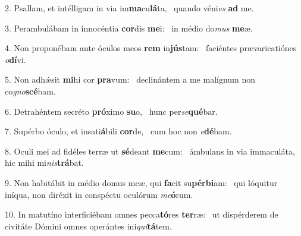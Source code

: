 2. Psallam, et intélligam in via im\textbf{ma}cu\textbf{lá}ta, \ast\  quando véni\textit{es} \textbf{ad} me.\

3. Perambulábam in innocéntia \textbf{cor}dis \textbf{me}i: \ast\  in médio do\textit{mus} \textbf{me}æ.\

4. Non proponébam ante óculos meos \textbf{rem} in\textbf{jús}tam: \ast\  faciéntes prævaricatiónes \textit{o}\textbf{dí}vi.\

5. Non adhǽsit \textbf{mi}hi cor \textbf{pra}vum: \ast\  declinántem a me malígnum non co\textit{gno}\textbf{scé}bam.\

6. Detrahéntem secréto \textbf{pró}ximo \textbf{su}o, \ast\  hunc per\textit{se}\textbf{qué}bar.\

7. Supérbo óculo, et insati\textbf{á}bili \textbf{cor}de, \ast\  cum hoc non \textit{e}\textbf{dé}bam.\

8. Oculi mei ad fidéles terræ ut \textbf{sé}deant \textbf{me}cum: \ast\  ámbulans in via immaculáta, hic mihi mi\textit{nis}\textbf{trá}bat.\

9. Non habitábit in médio domus meæ, qui \textbf{fa}cit su\textbf{pér}\textbf{bi}am: \ast\  qui lóquitur iníqua, non diréxit in conspéctu oculórum \textit{me}\textbf{ó}rum.\

10. In matutíno interficiébam omnes pecca\textbf{tó}res \textbf{ter}ræ: \ast\  ut dispérderem de civitáte Dómini omnes operántes ini\textit{qui}\textbf{tá}tem.\

